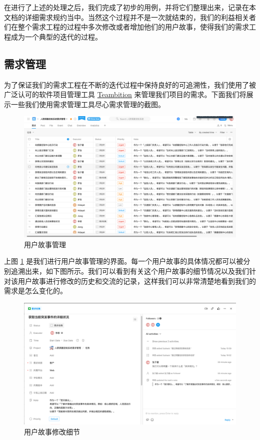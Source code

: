 \documentclass{ctexrep}
\begin{document}
在进行了上述的处理之后，我们完成了初步的用例，并将它们整理出来，记录在本文档的详细需求规约当中。当然这个过程并不是一次就结束的，我们的利益相关者们在整个需求工程的过程中多次修改或者增加他们的用户故事，使得我们的需求工程成为一个典型的迭代的过程。
\subsection{需求管理}
为了保证我们的需求工程在不断的迭代过程中保持良好的可追溯性，我们使用了被广泛认可的软件项目管理工具     \href{https://www.teambition.com/}{Teambition} 来管理我们项目的需求。下面我们将展示一些我们使用需求管理工具尽心需求管理的截图。
\begin{figure}[H]
	\centering
	\includegraphics[scale=0.24]{img/userStory.png}
	\caption{\label{fig:team_story} 用户故事管理}
\end{figure}
上图 \ref{fig:team_story} 是我们进行用户故事管理的界面。每一个用户故事的具体情况都可以被分别追溯出来，如下图所示。我们可以看到有关这个用户故事的细节情况以及我们针对该用户故事进行修改的历史和交流的记录，这样我们可以非常清楚地看到我们的需求是怎么变化的。
\begin{figure}[H]
	\centering
	\includegraphics[scale=0.24]{img/storyDetail.png}
	\caption{\label{fig:story_detail} 用户故事修改细节}
\end{figure}
\end{document}
